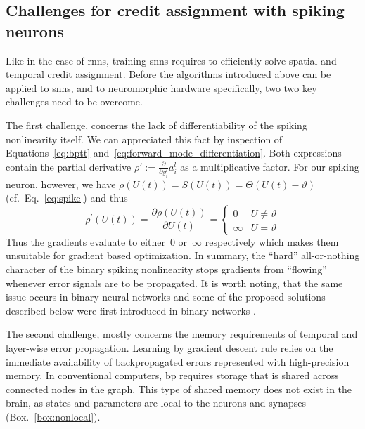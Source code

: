 \documentclass[journal,onecolumn,11pt]{IEEEtran}
\newcommand{\refbox}[1]{{\color{blue!70}(Box.~\ref{#1})}}
\newcommand{\Dp}[2][]{\frac{\partial #1}{\partial #2}}
\begin{document}
\subsection{Challenges for credit assignment with spiking neurons}
Like in the case of \glspl{rnn}, training \glspl{snn} requires to efficiently solve spatial and temporal credit assignment. 
Before the algorithms introduced above can be applied to \glspl{snn}, and to neuromorphic hardware specifically, two two key challenges need to be overcome.

The first challenge, concerns the lack of differentiability of the spiking nonlinearity itself. 
We can appreciated this fact by inspection of Equations~\eqref{eq:bptt} and~\eqref{eq:forward_mode_differentiation}.
Both expressions contain the partial derivative $\rho' := \Dp{y_i^l}{a_i^l}$ as a multiplicative factor.
For our spiking neuron, however, we have $\rho(U(t))=S(U(t))=\Theta(U(t)-\vartheta)$ (cf.\ Eq.~\eqref{eq:spike}) and thus 
\begin{equation}
\rho^\prime(U(t))=\frac{\partial \rho(U(t))}{\partial U(t)}=
\begin{cases}
0 & U\ne\vartheta\\
\infty & U=\vartheta
\end{cases}
\end{equation}
Thus the gradients evaluate to either~$0$ or~$\infty$ respectively which makes them unsuitable for gradient based optimization.
In summary, the ``hard'' all-or-nothing character of the binary spiking nonlinearity stops gradients from ``flowing'' whenever error signals are to be propagated.
It is worth noting, that the same issue occurs in binary neural networks and some of the proposed solutions described below were first introduced in binary networks . 

The second challenge, mostly concerns the memory requirements of temporal and layer-wise error propagation.
Learning by gradient descent rule relies on the immediate availability of backpropagated errors represented with high-precision memory.
In conventional computers, \Gls{bp} requires storage that is shared across connected nodes in the graph.
This type of shared memory does not exist in the brain, as states and parameters are local to the neurons and synapses \refbox{box:nonlocal}.
\end{document}
